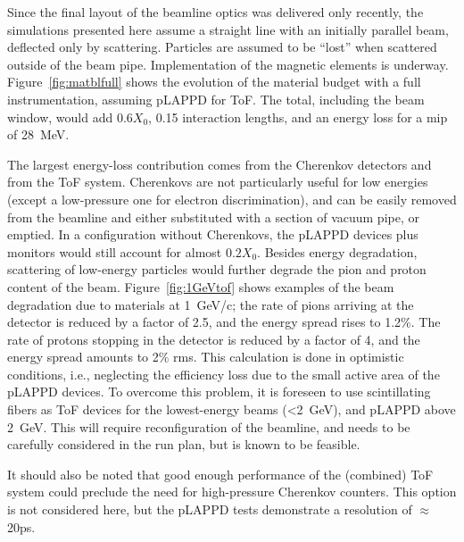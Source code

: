 Since the final layout of the beamline optics was delivered only recently, the simulations presented here assume a straight line with an initially parallel beam, deflected only by scattering. Particles are assumed to be ``lost'' when scattered outside of the beam pipe. Implementation of the magnetic elements is underway. 
 Figure~\ref{fig:matblfull} shows the evolution of the material budget with a full instrumentation, assuming pLAPPD for ToF. The total, including the beam window, would add $0.6X_0$, 0.15 interaction lengths, and an energy loss for a mip of 28~MeV.

The largest energy-loss contribution comes from the Cherenkov detectors and from the  ToF system. Cherenkovs are not particularly useful for low energies (except a low-pressure one for electron discrimination), and can be easily removed from the beamline and either substituted with a section of vacuum pipe, or emptied.  
In a configuration %
without Cherenkovs, the pLAPPD devices plus monitors would still account for almost  $0.2X_0$. Besides energy degradation, scattering of low-energy particles would  further degrade the pion and proton content of the beam.  Figure~\ref{fig:1GeVtof} shows examples of the beam degradation due to materials at 1~GeV/c; the rate of pions arriving at the detector is reduced by a factor of 2.5, and the energy spread rises to 1.2\%. The rate of protons stopping in the detector is reduced by a factor of 4, and the energy spread amounts to 2\% rms. This calculation is done in optimistic conditions, i.e., neglecting the efficiency loss due to the small active area of the pLAPPD devices.
%
To overcome this problem, it is foreseen to use scintillating fibers as ToF devices for the lowest-energy beams (<2~GeV), and pLAPPD above 2~GeV.
   This will require reconfiguration of the beamline, and needs to be carefully considered in the run plan, but is known to be feasible. %

It should also be noted that good enough performance of the (combined) ToF system could preclude the need for high-pressure  Cherenkov counters. 
This option is not considered here, but %
 the pLAPPD tests demonstrate a resolution of $\approx$20ps.

